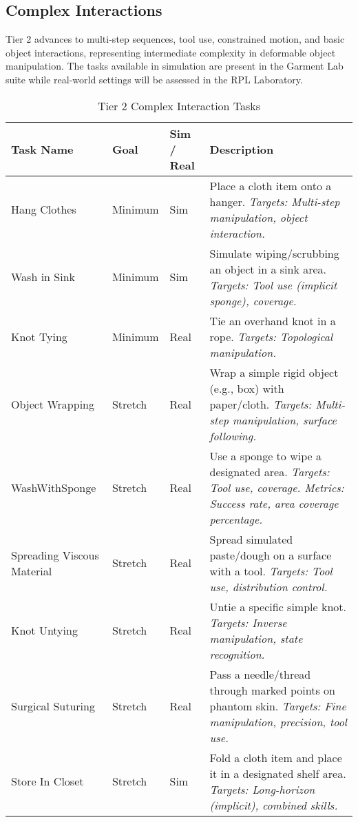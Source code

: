 \subsection{Complex Interactions}
\label{app:task_suite_2}

Tier 2 advances to multi-step sequences, tool use, constrained motion, and basic object interactions, representing intermediate complexity in deformable object manipulation. The tasks available in simulation are present in the Garment Lab suite while real-world settings will be assessed in the RPL Laboratory.

\begin{table}[h]
\centering
\begin{tabular}{|p{3.5cm}|p{2cm}|p{2cm}|p{7.5cm}|}
\hline
\textbf{Task Name} & \textbf{Goal} & \textbf{Sim / Real} & \textbf{Description} \\
\hline
Hang Clothes & Minimum & Sim & Place a cloth item onto a hanger. \textit{Targets: Multi-step manipulation, object interaction.} \\
\hline
Wash in Sink & Minimum & Sim & Simulate wiping/scrubbing an object in a sink area. \textit{Targets: Tool use (implicit sponge), coverage.} \\
\hline
Knot Tying & Minimum & Real & Tie an overhand knot in a rope. \textit{Targets: Topological manipulation.} \\
\hline
Object Wrapping & Stretch & Real & Wrap a simple rigid object (e.g., box) with paper/cloth. \textit{Targets: Multi-step manipulation, surface following.} \\
\hline
WashWithSponge & Stretch & Real & Use a sponge to wipe a designated area. \textit{Targets: Tool use, coverage. Metrics: Success rate, area coverage percentage.} \\
\hline
Spreading Viscous Material & Stretch & Real & Spread simulated paste/dough on a surface with a tool. \textit{Targets: Tool use, distribution control.} \\
\hline
Knot Untying & Stretch & Real & Untie a specific simple knot. \textit{Targets: Inverse manipulation, state recognition.} \\
\hline
Surgical Suturing & Stretch & Real & Pass a needle/thread through marked points on phantom skin. \textit{Targets: Fine manipulation, precision, tool use.} \\
\hline
Store In Closet & Stretch & Sim & Fold a cloth item and place it in a designated shelf area. \textit{Targets: Long-horizon (implicit), combined skills.} \\
\hline
\end{tabular}
\caption{Tier 2 Complex Interaction Tasks}
\end{table}

